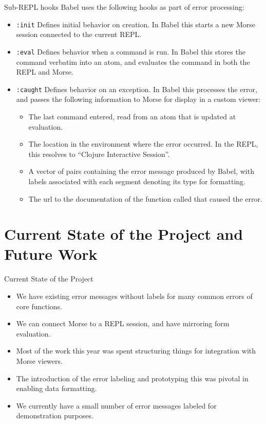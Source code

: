 \documentclass{beamer}
\begin{document}
\begin{frame}{Sub-REPL hooks}
  Babel uses the following hooks as part of error processing:
  \begin{itemize}
    \item<1-> \texttt{:init} Defines initial behavior on creation. In Babel this starts a new Morse session connected to the current REPL.
    \item<2-> \texttt{:eval} Defines behavior when a command is run. In Babel this stores the command verbatim into an atom, and evaluates the command in both the REPL and Morse.
    \item<3-> \texttt{:caught} Defines behavior on an exception. In Babel this processes the error, and passes the following information to Morse for display in a custom viewer:
      \begin{itemize}
        \item The last command entered, read from an atom that is updated at evaluation.
        \item The location in the environment where the error occurred. In the REPL, this
        resolves to “Clojure Interactive Session”.
        \item A vector of pairs containing the error message produced by Babel, with labels associated with each segment denoting its type for formatting.
        \item The url to the documentation of the function called that caused the error.
      \end{itemize}
  \end{itemize}
\end{frame}

\section{Current State of the Project and Future Work}
\begin{frame}{Current State of the Project}
  \begin{itemize}
    \item<1-> We have existing error messages without labels for many common errors of core functions.
    \item<2-> We can connect Morse to a REPL session, and have mirroring form evaluation.
    \item<3-> Most of the work this year was spent structuring things for integration with Morse viewers.
    \item<4-> The introduction of the error labeling and prototyping this was pivotal in enabling data formatting.
    \item<5-> We currently have a small number of error messages labeled for demonstration purposes.
  \end{itemize}
\end{frame}
\end{document}

